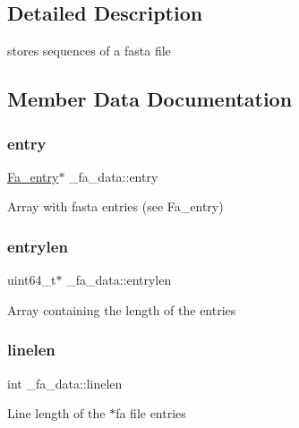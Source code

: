 \subsection{Detailed Description}
stores sequences of a fasta file 

\subsection{Member Data Documentation}
\mbox{\label{struct__fa__data_a3c2c4488c834a828085df7b409d292e4}} 
\subsubsection{\texorpdfstring{entry}{entry}}
{\footnotesize\ttfamily \mbox{\hyperlink{fa__read_8h_a8f68b28ad3a6c33fe1dd78d5ac044b30}{Fa\+\_\+entry}}$\ast$ \+\_\+fa\+\_\+data\+::entry}

Array with fasta entries (see Fa\+\_\+entry) \mbox{\label{struct__fa__data_acdb54c828a0fbfe8b8851f5290afc16e}} 
\subsubsection{\texorpdfstring{entrylen}{entrylen}}
{\footnotesize\ttfamily uint64\+\_\+t$\ast$ \+\_\+fa\+\_\+data\+::entrylen}

Array containing the length of the entries \mbox{\label{struct__fa__data_a3607f37f43d8b2f14ced6a93c6a444ff}} 
\subsubsection{\texorpdfstring{linelen}{linelen}}
{\footnotesize\ttfamily int \+\_\+fa\+\_\+data\+::linelen}

Line length of the $\ast$fa file entries \mbox{\label{struct__fa__data_a2e49d8da3a888d7df62cd887367e2923}} 
